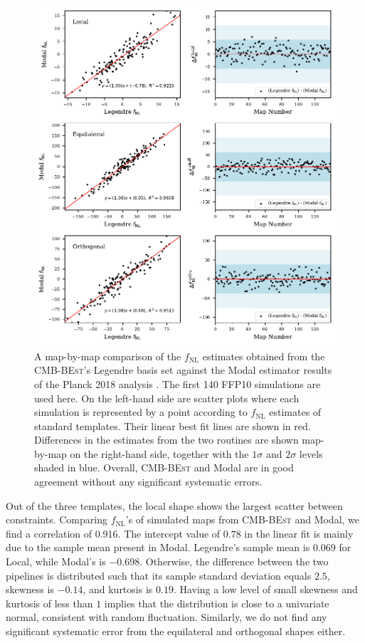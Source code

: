 \begin{figure}[htbp!] 
	\centering    
	\includegraphics{map_by_map_Legendre_Modal.pdf}
	\caption{A map-by-map comparison of the $f_\text{NL}$ estimates obtained from the \textsc{CMB-BEst}'s Legendre basis set against the Modal estimator results of the Planck 2018 analysis \cite{PlanckCollaboration2018}. The first 140 FFP10 simulations are used here. On the left-hand side are scatter plots where each simulation is represented by a point according to $f_\text{NL}$ estimates of standard templates. Their linear best fit lines are shown in red. Differences in the estimates from the two routines are shown map-by-map on the right-hand side, together with the $1\sigma$ and $2\sigma$ levels shaded in blue. Overall, \textsc{CMB-BEst} and Modal are in good agreement without any significant systematic errors.}
	\label{fig:map_by_map_Legendre_Modal}
\end{figure}

Out of the three templates, the local shape shows the largest scatter between constraints. Comparing $f_\text{NL}$'s of simulated maps from \textsc{CMB-BEst} and Modal, we find a correlation of 0.916. The intercept value of $0.78$ in the linear fit is mainly due to the sample mean present in Modal. Legendre's sample mean is $0.069$ for Local, while Modal's is $-0.698$. Otherwise, the difference between the two pipelines is distributed such that its sample standard deviation equals $2.5$, skewness is $-0.14$, and kurtosis is $0.19$. Having a low level of small skewness and kurtosis of less than $1$ implies that the distribution is close to a univariate normal, consistent with random fluctuation. Similarly, we do not find any significant systematic error from the equilateral and orthogonal shapes either.


